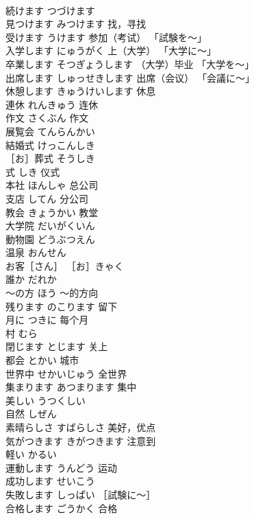 \documentclass[8pt]{extreport}
\begin{document}
\begin{CJK}{UTF8}{min}
\\	続けます	つづけます	
\\	見つけます	みつけます 找，寻找	
\\	受けます	うけます 参加（考试） 「試験を〜」	
\\	入学します	にゅうがく 上（大学） 「大学に〜」	
\\	卒業します	そつぎょうします （大学）毕业 「大学を〜」	
\\	出席します	しゅっせきします 出席（会议） 「会議に〜」	
\\	休憩します	きゅうけいします 休息	
\\	連休	れんきゅう 连休	
\\	作文	さくぶん 作文	
\\	展覧会	てんらんかい	
\\	結婚式	けっこんしき	
\\	［お］葬式	そうしき	
\\	式	しき 仪式	
\\	本社	ほんしゃ 总公司	
\\	支店	してん 分公司	
\\	教会	きょうかい 教堂	
\\	大学院	だいがくいん	
\\	動物園	どうぶつえん	
\\	温泉	おんせん	
\\	お客［さん］	［お］きゃく	
\\	誰か	だれか	
\\	〜の方	ほう ～的方向	
\\	残ります	のこります 留下	
\\	月に	つきに 每个月	
\\	村	むら	
\\	閉じます	とじます 关上	
\\	都会	とかい 城市	
\\	世界中	せかいじゅう 全世界	
\\	集まります	あつまります 集中	
\\	美しい	うつくしい	
\\	自然	しぜん	
\\	素晴らしさ	すばらしさ 美好，优点	
\\	気がつきます	きがつきます 注意到	
\\	軽い	かるい	
\\	運動します	うんどう 运动	
\\	成功します	せいこう	
\\	失敗します	しっぱい ［試験に〜］	
\\	合格します	ごうかく 合格	

\end{CJK}
\end{document}
